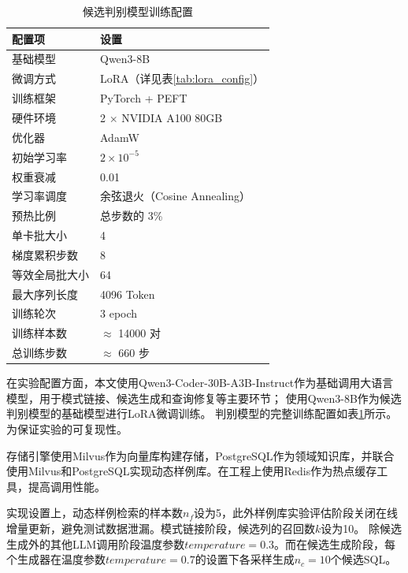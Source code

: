 \begin{table}[htbp]
	\setlength{\abovecaptionskip}{5pt}
	\setlength{\belowcaptionskip}{5pt}
	\caption{候选判别模型训练配置}
	\label{tab:train_config}
	\centering
	\begin{tabular}{ll}
		\toprule
		配置项 & 设置 \\
		\midrule
		基础模型 & Qwen3-8B \\
		微调方式 & LoRA（详见表\ref{tab:lora_config}） \\
		训练框架 & PyTorch + PEFT \\
		硬件环境 & 2 $\times$ NVIDIA A100 80GB \\
		\midrule
		优化器 & AdamW\cite{loshchilov2019adamw}{} \\
		初始学习率 & $2 \times 10^{-5}$ \\
		权重衰减 & 0.01 \\
		学习率调度 & 余弦退火（Cosine Annealing） \\
		预热比例 & 总步数的 3\% \\
		\midrule
		单卡批大小 & 4 \\
		梯度累积步数 & 8 \\
		等效全局批大小 & 64 \\
		最大序列长度 & 4096 Token \\
		训练轮次 & 3 epoch \\
		训练样本数 & $\approx$ 14000 对 \\
		总训练步数 & $\approx$ 660 步 \\
		\bottomrule
	\end{tabular}
\end{table}

在实验配置方面，本文使用Qwen3-Coder-30B-A3B-Instruct\cite{qwen32024}作为基础调用大语言模型，用于模式链接、候选生成和查询修复等主要环节；
使用Qwen3-8B\cite{qwen32024}作为候选判别模型的基础模型进行LoRA微调训练。
判别模型的完整训练配置如表\ref{tab:train_config}所示。
为保证实验的可复现性。



存储引擎使用Milvus作为向量库构建存储，PostgreSQL作为领域知识库，并联合使用Milvus和PostgreSQL实现动态样例库。在工程上使用Redis作为热点缓存工具，提高调用性能。

实现设置上，动态样例检索的样本数$n_f$设为5，此外样例库实验评估阶段关闭在线增量更新，避免测试数据泄漏。模式链接阶段，候选列的召回数$k$设为10。
除候选生成外的其他LLM调用阶段温度参数$temperature = 0.3$。而在候选生成阶段，每个生成器在温度参数$temperature = 0.7$的设置下各采样生成$n_c = 10$个候选SQL。


